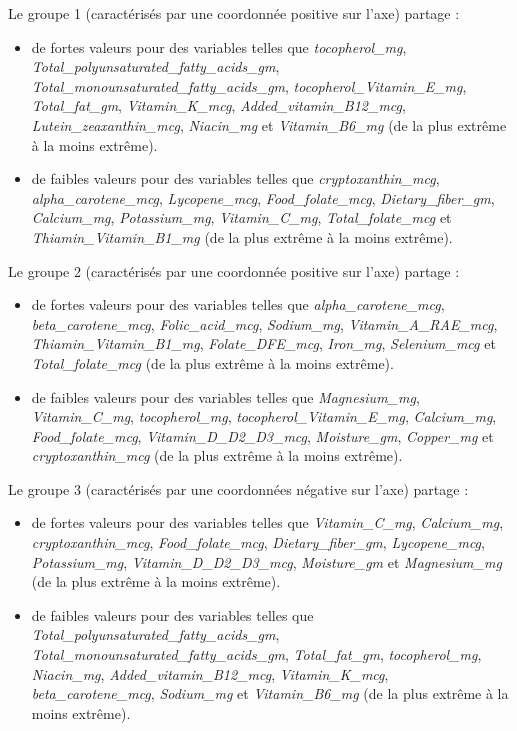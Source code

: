 \documentclass[]{article}
\providecommand{\tightlist}{%
  \setlength{\itemsep}{0pt}\setlength{\parskip}{0pt}}
\begin{document}
Le groupe 1 (caractérisés par une coordonnée positive sur l'axe) partage
:

\begin{itemize}
\tightlist
\item
  de fortes valeurs pour des variables telles que \emph{tocopherol\_mg},
  \emph{Total\_polyunsaturated\_fatty\_acids\_gm},
  \emph{Total\_monounsaturated\_fatty\_acids\_gm},
  \emph{tocopherol\_Vitamin\_E\_mg}, \emph{Total\_fat\_gm},
  \emph{Vitamin\_K\_mcg}, \emph{Added\_vitamin\_B12\_mcg},
  \emph{Lutein\_zeaxanthin\_mcg}, \emph{Niacin\_mg} et
  \emph{Vitamin\_B6\_mg} (de la plus extrême à la moins extrême).
\item
  de faibles valeurs pour des variables telles que
  \emph{cryptoxanthin\_mcg}, \emph{alpha\_carotene\_mcg},
  \emph{Lycopene\_mcg}, \emph{Food\_folate\_mcg},
  \emph{Dietary\_fiber\_gm}, \emph{Calcium\_mg}, \emph{Potassium\_mg},
  \emph{Vitamin\_C\_mg}, \emph{Total\_folate\_mcg} et
  \emph{Thiamin\_Vitamin\_B1\_mg} (de la plus extrême à la moins
  extrême).
\end{itemize}

Le groupe 2 (caractérisés par une coordonnée positive sur l'axe) partage
:

\begin{itemize}
\tightlist
\item
  de fortes valeurs pour des variables telles que
  \emph{alpha\_carotene\_mcg}, \emph{beta\_carotene\_mcg},
  \emph{Folic\_acid\_mcg}, \emph{Sodium\_mg},
  \emph{Vitamin\_A\_RAE\_mcg}, \emph{Thiamin\_Vitamin\_B1\_mg},
  \emph{Folate\_DFE\_mcg}, \emph{Iron\_mg}, \emph{Selenium\_mcg} et
  \emph{Total\_folate\_mcg} (de la plus extrême à la moins extrême).
\item
  de faibles valeurs pour des variables telles que \emph{Magnesium\_mg},
  \emph{Vitamin\_C\_mg}, \emph{tocopherol\_mg},
  \emph{tocopherol\_Vitamin\_E\_mg}, \emph{Calcium\_mg},
  \emph{Food\_folate\_mcg}, \emph{Vitamin\_D\_D2\_D3\_mcg},
  \emph{Moisture\_gm}, \emph{Copper\_mg} et \emph{cryptoxanthin\_mcg}
  (de la plus extrême à la moins extrême).
\end{itemize}

Le groupe 3 (caractérisés par une coordonnées négative sur l'axe)
partage :

\begin{itemize}
\tightlist
\item
  de fortes valeurs pour des variables telles que \emph{Vitamin\_C\_mg},
  \emph{Calcium\_mg}, \emph{cryptoxanthin\_mcg},
  \emph{Food\_folate\_mcg}, \emph{Dietary\_fiber\_gm},
  \emph{Lycopene\_mcg}, \emph{Potassium\_mg},
  \emph{Vitamin\_D\_D2\_D3\_mcg}, \emph{Moisture\_gm} et
  \emph{Magnesium\_mg} (de la plus extrême à la moins extrême).
\item
  de faibles valeurs pour des variables telles que
  \emph{Total\_polyunsaturated\_fatty\_acids\_gm},
  \emph{Total\_monounsaturated\_fatty\_acids\_gm},
  \emph{Total\_fat\_gm}, \emph{tocopherol\_mg}, \emph{Niacin\_mg},
  \emph{Added\_vitamin\_B12\_mcg}, \emph{Vitamin\_K\_mcg},
  \emph{beta\_carotene\_mcg}, \emph{Sodium\_mg} et
  \emph{Vitamin\_B6\_mg} (de la plus extrême à la moins extrême).
\end{itemize}
\end{document}
